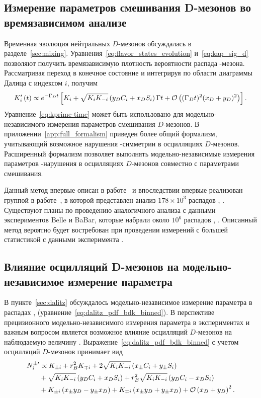 \subsection{Измерение параметров смешивания D-мезонов во времязависимом анализе}\label{sec:time-dependent-charm-mixing} \label{sec:charm_mixing_measurement_at_bfac}
Временная эволюция нейтральных $D$-мезонов обсуждалась в разделе~\ref{sec:mixing}.  Уравнения~\eqref{eq:flavor_states_evolution} и~\eqref{eq:kap_sig_d} позволяют получить времязависимую плотность вероятности распада \dn-мезона.  Рассматривая переход в конечное состояние \kspp и интегрируя по области диаграммы Далица с индексом $i$, получим
\begin{equation}\label{eq:kprime-time}
 K_i^{\prime}\left( t\right) \propto e^{-\Gamma_D t}\left[ K_i+\sqrt{K_iK_{-i}}\left( y_DC_i+x_DS_i\right)\Gamma t+ \mathcal{O}\left((\Gamma_Dt)^2(x_D+y_D)^2\right) \right].
\end{equation}
Уравнение~\ref{eq:kprime-time} может быть использовано для модельно-независимого измерения параметров смешивания $D$-мезонов.  В приложении~\ref{app:full_formalism} приведен более общий формализм, учитывающий возможное нарушения \cpconj-симметрии в осцилляциях $D$-мезонов.  Расширенный формализм позволяет выполнять модельно-независимые измерения параметров \cpconj-нарушения в осцилляциях $D$-мезонов совместно с параметрами смешивания.  

Данный метод впервые описан в работе~\cite{mixing} и впоследствии впервые реализован группой \lhcb в работе~\cite{lhcb_dkspp_mixing}, в которой представлен анализ $178\times 10^3$ распадов \dstpdpip, \dnkpp.  Существуют планы по проведению аналогичного анализа с данными экспериментов Belle и BaBar, которые набрали около $10^6$ распадов \dstpdpip, \dnkpp.  Описанный метод вероятно будет востребован при проведении измерений с большей статистикой с данными эксперимента \belleii.

\subsection{Влияние осцилляций D-мезонов на модельно-независимое измерение параметра \gphi}\label{sec:gamma-and-charm-mixing}
В пункте~\ref{sec:dalitz} обсуждалось модельно-независимое измерение параметра \gphi в распадах \bdk, \dkpp (уравнение~\eqref{eq:dalitz_pdf_bdk_binned}).  В перспективе прецизионного модельно-независимого измерения параметра \gphi в экспериментах \belleii и \lhcb важным вопросом является возможное влияние осцилляций $D$-мезонов на наблюдаемую величину \gphi.  Выражение~\eqref{eq:dalitz_pdf_bdk_binned} с учетом осцилляций $D$-мезонов принимает вид
\begin{equation}\label{eq:n_mix}
  \begin{split}
   N^{\pm\prime}_i 
    & \propto K_{\pm i} + r_B^2K_{\mp i} + 2\sqrt{K_iK_{-i}}\left( x_{\pm}C_i+y_{\pm}S_i\right) \\
    & +\sqrt{K_iK_{-i}}\left( y_DC_i+x_DS_i\right) + r_B^2\sqrt{K_iK_{-i}}\left( y_DC_i-x_DS_i\right)\\
    & + K_{\pm i}\left( x_{\pm}y_D-y_{\pm}x_D\right) + K_{\mp i}\left( x_{\pm}y_D+y_{\pm}x_D\right)+\mathcal{O}\left(x_D+y_D\right)^2. 
  \end{split}
\end{equation}

